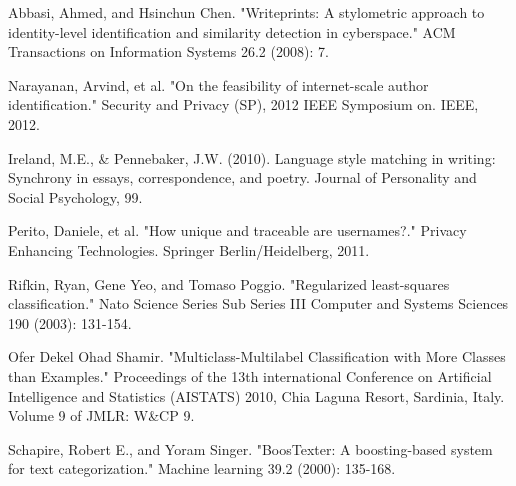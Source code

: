 \documentclass[10pt, conference, compsocconf]{IEEEtran}
\begin{document}








%
%
%
\begin{thebibliography}{1}

Abbasi, Ahmed, and Hsinchun Chen. "Writeprints: A stylometric approach to identity-level identification and similarity detection in cyberspace." ACM Transactions on Information Systems 26.2 (2008): 7.

Narayanan, Arvind, et al. "On the feasibility of internet-scale author identification." Security and Privacy (SP), 2012 IEEE Symposium on. IEEE, 2012.

Ireland, M.E., \& Pennebaker, J.W. (2010).  Language style matching in writing: Synchrony in essays, correspondence, and poetry.  Journal of Personality and Social Psychology, 99.

Perito, Daniele, et al. "How unique and traceable are usernames?." Privacy Enhancing Technologies. Springer Berlin/Heidelberg, 2011.

Rifkin, Ryan, Gene Yeo, and Tomaso Poggio. "Regularized least-squares classification." Nato Science Series Sub Series III Computer and Systems Sciences 190 (2003): 131-154.

Ofer Dekel Ohad Shamir. "Multiclass-Multilabel Classification with More Classes than Examples." Proceedings of the 13th international Conference on Artificial Intelligence and Statistics (AISTATS) 2010, Chia Laguna Resort, Sardinia, Italy. Volume 9 of JMLR: W\&CP 9.

Schapire, Robert E., and Yoram Singer. "BoosTexter: A boosting-based system for text categorization." Machine learning 39.2 (2000): 135-168.

\end{thebibliography}




\end{document}
